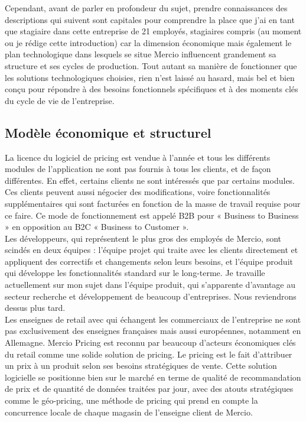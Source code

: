 \documentclass{rapportCS}
\begin{document}
	Cependant, avant de parler en profondeur du sujet, prendre connaissances des descriptions qui suivent sont capitales pour comprendre la place que j'ai en tant que stagiaire dans cette entreprise de 21 employés, stagiaires compris (au moment ou je rédige cette introduction) car la dimension économique mais également le plan technologique dans lesquels se situe Mercio influencent grandement sa structure et ses cycles de production. Tout autant sa manière de fonctionner que les solutions technologiques choisies, rien n'est laissé au hasard, mais bel et bien conçu pour répondre à des besoins fonctionnels spécifiques et à des moments clés du cycle de vie de l'entreprise.
\subsection{Modèle économique et structurel}
	La licence du logiciel de pricing est vendue à l'année et tous les différents modules de l'application ne sont pas fournis à tous les clients, et de façon différentes. En effet, certains clients ne sont intéressés que par certains modules. Ces clients peuvent aussi négocier des modifications, voire fonctionnalités supplémentaires qui sont facturées en fonction de la masse de travail requise pour ce faire. Ce mode de fonctionnement est appelé B2B pour « Business to Business » en opposition au B2C « Business to Customer ». \\
	Les développeurs, qui représentent le plus gros des employés de Mercio, sont scindés en deux équipes : l'équipe projet qui traite avec les clients directement et appliquent des correctifs et changements selon leurs besoins, et l'équipe produit qui développe les fonctionnalités standard sur le long-terme. Je travaille actuellement sur mon sujet dans l'équipe produit, qui s'apparente d'avantage au secteur recherche et développement de beaucoup d'entreprises. Nous reviendrons dessus plus tard. \\
Les enseignes de retail avec qui échangent les commerciaux de l'entreprise ne sont pas exclusivement des enseignes françaises mais aussi européennes, notamment en Allemagne. Mercio Pricing est reconnu par beaucoup d'acteurs économiques clés du retail comme une solide solution de pricing. Le pricing est le fait d'attribuer un prix à un produit selon ses besoins stratégiques de vente. Cette solution logicielle se positionne bien sur le marché en terme de qualité de recommandation de prix et de quantité de données traitées par jour, avec des atouts stratégiques comme le géo-pricing, une méthode de pricing qui prend en compte la concurrence locale de chaque magasin de l'enseigne client de Mercio. \\
\end{document}
